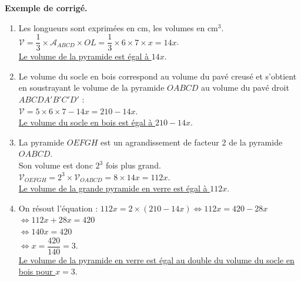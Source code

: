 \begin{activite}
   \bigskip
   
   \textcolor{G1}{
   {\bf Exemple de corrigé.} \smallskip
      \begin{enumerate}
         \item Les longueurs sont exprimées en cm, les volumes en cm$^3$. \\ [1mm]
            $\mathcal{V} =\dfrac13\times\mathcal{A}_{ABCD}\times OL =\dfrac13\times6\times7\times x =14x$. \\ [1mm]
            \uline{Le volume de la pyramide est égal à $14x$}.            
         \item Le volume du socle en bois correspond au volume du pavé creusé et s'obtient en soustrayant le volume de la pyramide $OABCD$ au volume du pavé droit $ABCDA'B'C'D'$ : \\
            $\mathcal{V} =5\times6\times7-14x =210-14x$. \\
            \uline{Le volume du socle en bois est égal à $210-14x$}.
         \item La pyramide $OEFGH$ est un agrandissement de facteur 2 de la pyramide $OABCD$. \\
            Son volume est donc $2^3$ fois plus grand. \\
            $\mathcal{V}_{OEFGH} =2^3\times\mathcal{V}_{OABCD} =8\times14x =112x$. \\
            \uline{Le volume de la grande pyramide en verre est égal à $112x$}.   
         \item On résout l'équation : $112x =2\times(210-14x) \iff 112x =420-28x $ \\
            \hspace*{6.6cm} $\iff 112x+28x =420$ \\
            \hspace*{6.6cm} $\iff 140x =420$ \\ [1mm]
            \hspace*{6.6cm} $\iff x =\dfrac{420}{140} =3$. \\ [1mm]
            \uline{Le volume de la pyramide en verre est égal au double du volume du socle en bois pour $x =3$}.
   \end{enumerate}}
\end{activite}

\pagebreak %

